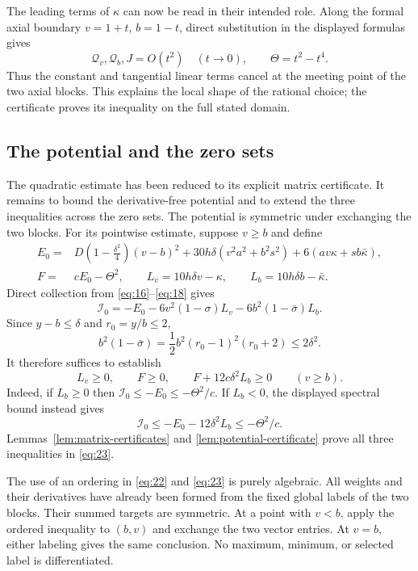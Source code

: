 The leading terms of $\kappa$ can now be read in their intended role.
Along the formal axial boundary $v=1+t$, $b=1-t$, direct substitution
in the displayed formulas gives
\[
 \mathcal Q_v,\mathcal Q_b,J=O(t^2)\quad(t\to0),
 \qquad \Theta=t^2-t^4.
\]
Thus the constant and tangential linear terms cancel at the meeting
point of the two axial blocks. This explains the local shape of the
rational choice; the certificate proves its inequality on the full
stated domain.

\subsection{The potential and the zero sets}

The quadratic estimate has been reduced to its explicit matrix certificate.
It remains to bound the derivative-free potential and to extend the
three inequalities across the zero sets. The potential is symmetric under exchanging the two blocks. For its
pointwise estimate, suppose $v\ge b$ and define
\[
\begin{aligned}
 E_0={}&D\left(1-\frac{\delta^2}{4}\right)(v-b)^2
       +30h\delta(v^2a^2+b^2s^2)
       +6(av\kappa+sb\bar\kappa),\\
 F={}&cE_0-\Theta^2,\qquad
 L_v=10h\delta v-\kappa,\qquad
 L_b=10h\delta b-\bar\kappa.
\end{aligned}
\]
Direct collection from \eqref{eq:16}--\eqref{eq:18} gives
\[
 \mathcal I_0=-E_0-6v^2(1-\sigma)L_v
                    -6b^2(1-\bar\sigma)L_b.
\]
Since $y-b\le\delta$ and $r_0=y/b\le2$,
\[
 b^2(1-\bar\sigma)
 =\frac12b^2(r_0-1)^2(r_0+2)\le2\delta^2.
\]
It therefore suffices to establish
\begin{equation}
 L_v\ge0,\qquad F\ge0,\qquad
 F+12c\delta^2L_b\ge0\qquad(v\ge b).
\tag{23}\label{eq:23}
\end{equation}
Indeed, if $L_b\ge0$ then $\mathcal I_0\le-E_0\le-\Theta^2/c$.
If $L_b<0$, the displayed spectral bound instead gives
\[
 \mathcal I_0\le-E_0-12\delta^2L_b\le-\Theta^2/c.
\]
Lemmas~\ref{lem:matrix-certificates} and
\ref{lem:potential-certificate} prove all three inequalities in
\eqref{eq:23}.

The use of an ordering in \eqref{eq:22} and \eqref{eq:23} is purely
algebraic. All weights and their derivatives have already been formed
from the fixed global labels of the two blocks. Their summed targets
are symmetric. At a point with $v<b$, apply the ordered inequality to
$(b,v)$ and exchange the two vector entries. At $v=b$, either labeling
gives the same conclusion. No maximum, minimum, or selected label is
differentiated.

